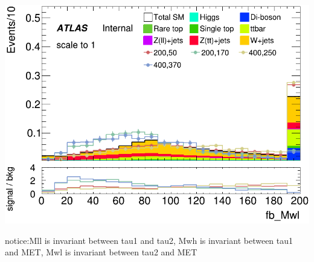 \documentclass[usenames,dvipsnames]{beamer}
\begin{document}
\begin{frame}
\begin{minipage}{0.32\textwidth}
        \includegraphics[width=\textwidth]{graphics/LH_met_sig/LH_fb_Mwl_norm.png}
    \end{minipage}	
notice:Mll is invariant between tau1 and tau2, Mwh is invariant between tau1 and MET, Mwl is invariant between tau2 and MET  
\end{frame}
\end{document}
